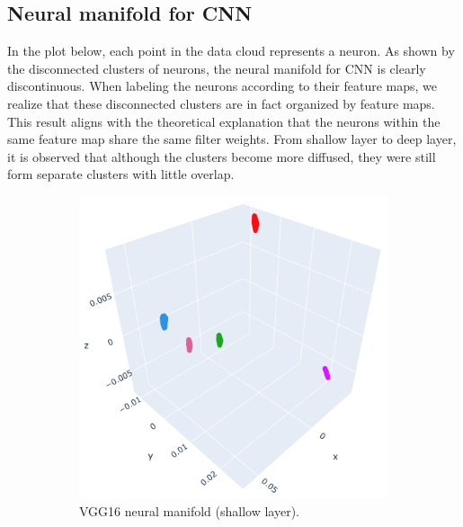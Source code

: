 \subsection{Neural manifold for CNN}
In the plot below, each point in the data cloud represents a neuron. As shown by the disconnected clusters of neurons, the neural manifold for CNN is clearly discontinuous. When labeling the neurons according to their feature maps, we realize that these disconnected clusters are in fact organized by feature maps. This result aligns with the theoretical explanation that the neurons within the same feature map share the same filter weights. From shallow layer to deep layer, it is observed that although the clusters become more diffused, they were still form separate clusters with little overlap.

\begin{figure}[H]
\centering
\begin{subfigure}[b]{0.47\textwidth}
    \includegraphics[width=\textwidth]{figures/embeddings/VGG16-2D-block1.png}
    \caption{VGG16 neural manifold (shallow layer).}
\end{subfigure}
\hfill
\begin{subfigure}[b]{0.45\textwidth}

\end{subfigure}
\end{figure}
